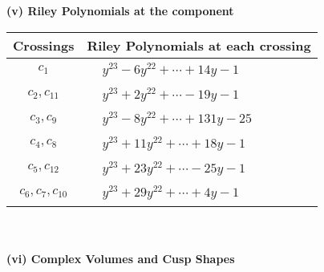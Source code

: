 \documentclass[1p]{elsarticle_modified}
\theoremstyle{definition}
\begin{document}
\newpage\renewcommand{\arraystretch}{1}
\flushleft \textbf{(v) Riley Polynomials at the component}\newline \\
\begin{tabular}{m{50pt}|m{274pt}}
Crossings & \hspace{64pt}Riley Polynomials at each crossing \\
\hline $$\begin{aligned}c_{1}\end{aligned}$$&$\begin{aligned}
&y^{23}-6 y^{22}+\cdots+14 y-1
\end{aligned}$\\
\hline $$\begin{aligned}c_{2},c_{11}\end{aligned}$$&$\begin{aligned}
&y^{23}+2 y^{22}+\cdots-19 y-1
\end{aligned}$\\
\hline $$\begin{aligned}c_{3},c_{9}\end{aligned}$$&$\begin{aligned}
&y^{23}-8 y^{22}+\cdots+131 y-25
\end{aligned}$\\
\hline $$\begin{aligned}c_{4},c_{8}\end{aligned}$$&$\begin{aligned}
&y^{23}+11 y^{22}+\cdots+18 y-1
\end{aligned}$\\
\hline $$\begin{aligned}c_{5},c_{12}\end{aligned}$$&$\begin{aligned}
&y^{23}+23 y^{22}+\cdots-25 y-1
\end{aligned}$\\
\hline $$\begin{aligned}c_{6},c_{7},c_{10}\end{aligned}$$&$\begin{aligned}
&y^{23}+29 y^{22}+\cdots+4 y-1
\end{aligned}$\\
\hline
\end{tabular}\\~\\
\newpage\flushleft \textbf{(vi) Complex Volumes and Cusp Shapes}
\end{document}

